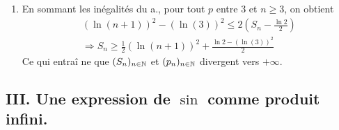 \begin{enumerate}
\begin{enumerate}
  \item  En sommant les inégalités du a., pour tout $p$ entre 3 et $n\geq 3$, on obtient 
\begin{multline*}
(\ln(n+1))^2 -(\ln(3))^2 \leq 2\left(S_n-\frac{\ln 2}{2} \right) \\ 
\Rightarrow
S_n \geq \frac{1}{2}(\ln(n+1))^2 + \frac{\ln 2 -(\ln(3))^2}{2}
\end{multline*}
Ce qui entra\^{i }ne que $(S_{n})_{n\in \mathbb{N}}$ et $(p_{n})_{n\in \mathbb{N}}$ divergent vers $+\infty $.
\end{enumerate}
\end{enumerate}

\subsection*{III. Une expression de $\sin$ comme produit infini.}

